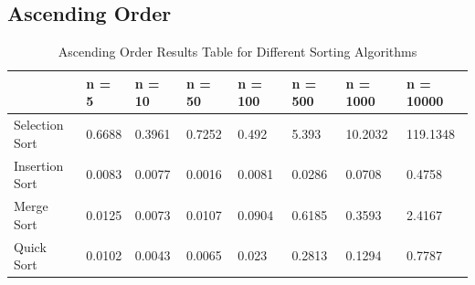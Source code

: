 \subsection{Ascending Order}

\begin{table}[ht]
    \centering
    \caption{Ascending Order Results Table for Different Sorting Algorithms}
    \begin{tabular}[t]{|l| l l l l l l l|} 
    \hline
    & n = 5 & n = 10 & n = 50 & n = 100 & n = 500 & n = 1000 & n = 10000\\ [0.5ex] 
    \hline
    Selection Sort & 0.6688	& 0.3961 &	0.7252 &	0.492	 & 5.393 &	10.2032	& 119.1348 \\ 
    \hline
    Insertion Sort & 0.0083	& 0.0077 &	0.0016 &	0.0081 & 	0.0286	& 0.0708 &	0.4758\\
    \hline
    Merge Sort & 0.0125	& 0.0073 &	0.0107 &	0.0904 & 	0.6185	& 0.3593 &	2.4167\\
    \hline
    Quick Sort & 0.0102	& 0.0043 &	0.0065 &	0.023	 & 0.2813	& 0.1294 &	0.7787 \\
     \hline
    \end{tabular}
\end{table}

\begin{figure}[!ht]
	\centerline{}
	\label{fig:figure1}
\end{figure}